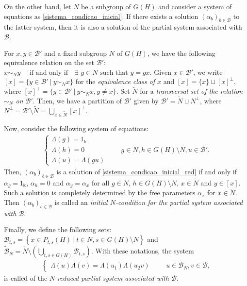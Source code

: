 \documentclass[reqno]{amsart}
\theoremstyle{definition}
\numberwithin{equation}{section}\theoremstyle{plain}
\newcommand{\B}{\mathcal{B}}
\theoremstyle{definition}
\def \k {\Bbbk}
\begin{document}
On the other hand, let $N$ be a subgroup of $G(H)$ and consider a system of equations as \eqref{sistema_condicao_inicial}.
If there exists a solution $(\alpha_b)_{b \in \B}$ to the latter system, then it is also a solution of the partial system associated with $\B$.

\medbreak

For $x, y \in \B'$ and a fixed subgroup $N$ of $G(H)$, we have the following equivalence relation on the set $\B'$:
$ x \sim_N y  \quad \textrm{ if and only if} \quad  \exists  \, \,  g \in N  \textrm{ such that } y = gx.$
Given $ x \in \B'$, we write $[x] = \{y \in \B' \ | \ y \sim_N x \}$ for the \emph{equivalence class of $x$} and $[x] = \{x\} \sqcup [x]^{\perp}$, where $[x]^{\perp} = \{y \in \B' \ | \ y \sim_N x, y \neq x \}$.
Set $\widetilde{N}$ for a \emph{transversal set of the relation $\sim_N$ on $\B'$}. 
Then,  we have a partition of $\B'$ given by $\B' = \widetilde{N} \sqcup N^{\perp}$, where $N^{\perp}=\B' \setminus \widetilde{N} = \bigcup_{x \in \widetilde{N}} [x]^{\perp}$.

Now, consider the following system of equations:
\begin{align}\label{sistema_condicao_inicial_red}
\left\{\begin{array}{ll} \Lambda(g) = 1_\k \\
\Lambda(h) = 0 \\
\Lambda(u) = \Lambda(g u)\end{array}\right.
\qquad g \in N, h \in G(H) \setminus N, u \in \B'.
\end{align}
Then, $(\alpha_b)_{b \in \B}$ is a solution of \eqref{sistema_condicao_inicial_red} if and only if $\alpha_g= 1_\k$, $\alpha_h= 0$ and $\alpha_y=\alpha_x$ for all $g \in N$, $h \in G(H)\setminus N$, $x \in \widetilde{N}$ and $y \in [x]$. Such a solution is completely determined by the free parameters \(\alpha_x\) for $x \in \widetilde{N}$.
Then $(\alpha_b)_{b \in \B}$ is called an \emph{initial $N$-condition for the partial system associated with $\B$}.

Finally, we define the following sets: $\B_{t,s} = \left\{ x \in P_{t,s}(H) \ | \ t \in N,  s \in G(H) \setminus N \right\}$ and
$\widetilde{\B}_N = \widetilde{N} \setminus \left(\bigcup_{t,s \in G(H)} \B_{t,s}\right).$
With these notations, the system
\begin{align}\label{N_reduzido}
\left\{\begin{array}{ll}
\Lambda(u)\Lambda(v)= \Lambda({u}_1)\Lambda({u}_2 v)
\end{array}\right. \qquad u \in \widetilde{\B}_N, v \in \B,
\end{align}
is called of the \emph{$N$-reduced partial system associated with $\B$}.
\end{document}
